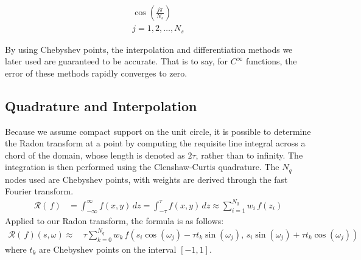 \begin{align*}
    \cos\left(\frac{j\pi}{N_s}\right) \\
    j = 1, 2, \dots, N_s
\end{align*}

By using Chebyshev points, the interpolation and differentiation methods we later used are guaranteed to be accurate.
That is to say, for $C^\infty$ functions, the error of these methods rapidly converges to zero.

\subsection{Quadrature and Interpolation}

Because we assume compact support on the unit circle, it is possible to determine the Radon transform at a point by computing the requisite line integral across a chord of the domain, whose length is denoted as $2\tau$, rather than to infinity.
The integration is then performed using the Clenshaw-Curtis quadrature.
The $N_q$ nodes used are Chebyshev points, with weights are derived through the fast Fourier transform.\cite{Trefethen:7} 
\begin{align*}
	\mathcal{R}(\,f) &= \int_{-\infty}^{\infty} f(x, y) \, dz = \int_{-\tau}^{\tau} f(x, y) \, dz \approx \sum_{i=1}^{N_q} w_{i} \, f(z_{i})
\end{align*}
Applied to our Radon transform, the formula is as follows:
\begin{align*}
    \mathcal{R}(\,f)(s, \omega) \approx \, & \tau \sum_{k=0}^{N_q} w_{k} \, f(s_{i} \cos (\omega_{j}) - \tau t_{k} \sin (\omega_{j}), \, s_{i} \sin (\omega_{j}) + \tau t_{k} \cos (\omega_{j}))
\end{align*}
where $t_k$ are Chebyshev points on the interval $[-1, 1]$.


